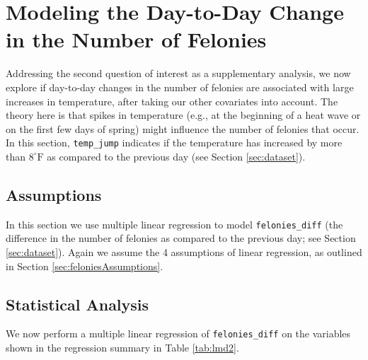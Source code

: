 \documentclass[11pt,notitlepage]{article}
\newenvironment{codeSmall}%
   {\par\noindent\adjustbox{margin=1ex,bgcolor=shadecolor,margin=0ex \medskipamount}\bgroup\minipage\linewidth\verbatim\footnotesize}%
   {\endverbatim\endminipage\egroup}
\newcommand{\degf}{^\circ\text{F}}
\begin{document}




\section{Modeling the Day-to-Day Change in the Number of Felonies}
\label{sec:modelingFeloniesDiff}


Addressing the second question of interest as a supplementary analysis, we now explore if day-to-day changes in the number of felonies are associated with large increases in temperature, after taking our other covariates into account. The theory here is that spikes in temperature (e.g., at the beginning of a heat wave or on the first few days of spring) might influence the number of felonies that occur. In this section, \texttt{temp_jump} indicates if the temperature has increased by more than $8\degf$ as compared to the previous day (see Section \ref{sec:dataset}).




\subsection{Assumptions}
\label{sec:feloniesDiffAssumptions}


In this section we use multiple linear regression to model \texttt{felonies_diff} (the difference in the number of felonies as compared to the previous day; see Section \ref{sec:dataset}). Again we assume the 4 assumptions of linear regression, as outlined in Section \ref{sec:feloniesAssumptions}.

\subsection{Statistical Analysis}
\label{sec:modelFeloniesDiffMultipleRegression}


We now perform a multiple linear regression of \texttt{felonies_diff} on the variables shown in the regression summary in Table \ref{tab:lmd2}.

\end{document}

